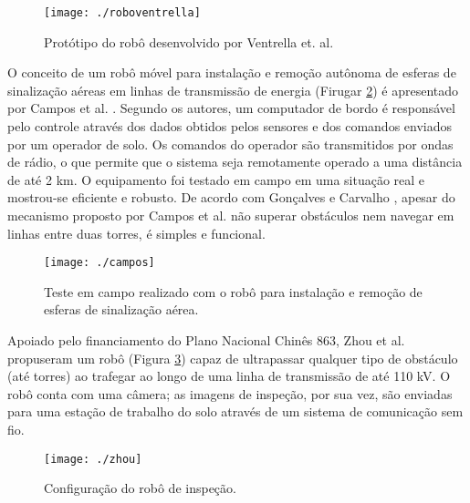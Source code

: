 \begin{figure} [h!]	
	\caption{Protótipo do robô desenvolvido por Ventrella et. al.}
	\label{img:roboventrella}											 
	\centering													 
	\texttt{[image: ./roboventrella]}
\end{figure}													 

O conceito de um robô móvel para instalação e remoção autônoma de esferas de sinalização aéreas em linhas de transmissão de energia (Firugar \ref{img:campos}) é apresentado por Campos et al. \cite{campos2002mobile}. Segundo os autores, um computador de bordo é responsável pelo controle através dos dados obtidos pelos sensores e dos comandos enviados por um operador de solo. Os comandos do operador são transmitidos por ondas de rádio, o que permite que o sistema seja remotamente operado a uma distância de até 2 km. O equipamento foi testado em campo em uma situação real e mostrou-se eficiente e robusto. De acordo com Gonçalves e Carvalho \cite{gonccalves2013review}, apesar do mecanismo proposto por Campos et al. \cite{campos2002mobile} não superar obstáculos nem navegar em linhas entre duas torres, é simples e funcional.

\begin{figure} [h!]	
	\caption{Teste em campo realizado com o robô para instalação e remoção de esferas de sinalização aérea.}
	\label{img:campos}											 
	\centering													 
	\texttt{[image: ./campos]}
\end{figure}													 

Apoiado pelo financiamento do Plano Nacional Chinês 863, Zhou et al. \cite{zhou2005control} propuseram um robô (Figura \ref{img:zhou}) capaz de ultrapassar qualquer tipo de obstáculo (até torres) ao trafegar ao longo de uma linha de transmissão de até 110 kV. O robô conta com uma câmera; as imagens de inspeção, por sua vez, são enviadas para uma estação de trabalho do solo através de um sistema de comunicação sem fio.  

\begin{figure} [h!]	
	\caption{Configuração do robô de inspeção.}
	\label{img:zhou}											 
	\centering													 
	\texttt{[image: ./zhou]}
\end{figure}													 

